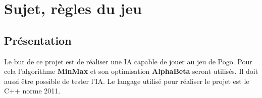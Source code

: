 \documentclass[article, backcover, french, nodocumentinfo]{upmethodology-document}
\begin{document}
	\upmdocumentsummary{}
	\upmdocumentauthors{}
	\upmdocumentinformedpeople{}
	\upmpublicationpage{}
	\thispagestyle{empty}
	\tableofcontents{}
	\newpage{}
	\lstlistoflistings{}
	\listoffigures{}
	\newpage{}

	\section{Sujet, règles du jeu}
		\subsection{Présentation}
			Le but de ce projet est de réaliser une IA capable de jouer au jeu de Pogo. Pour cela l'algorithme \textbf{MinMax} et son optimisation \textbf{AlphaBeta} seront utilisés. Il doit aussi être possible de tester l'IA. Le langage utilisé pour réaliser le projet est le C++ norme 2011.
\end{document}
